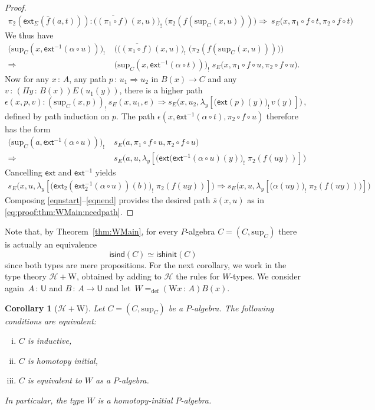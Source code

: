 \documentclass[10pt,a4paper,oneside,reqno]{amsart}
\theoremstyle{mythm}
\newtheorem{corollary}[theorem]{Corollary}
\theoremstyle{mydef}
\theoremstyle{myrmk}
\newcommand{\defeq}{=_{\mathrm{def}}}
\newcommand{\co}{\,{:}\,}
\newcommand{\com}{\circ}
\newcommand{\Hint}{\mathcal{H}}
\newcommand{\isalgind}{\mathsf{isind}}
\newcommand{\isalghinit}{\mathsf{ishinit}}
\newcommand{\ext}{\mathsf{ext}}
\newcommand{\lam}[1]{\lambda_{#1}}
\newcommand{\W}{\mathrm{W}}
\newcommand{\U}{\mathsf{U}}
\renewcommand{\sup}{\mathrm{sup}}
\begin{document}
\begin{proof}
\begin{align*}
\pi_2(\ext_\Sigma(\bar{f}(a,t))) : \big(\overline{(\pi_1 \com f)}(x,u)\big)_{!} \; \big(\pi_2(f (\sup_C(x,u))) \big)
\Rightarrow\ s_E\big(x,\pi_1 \circ f \circ t, \pi_2 \circ f \circ t\big)
\end{align*}
We thus have
\begin{align*}
\big(\sup_C(x,\ext^{-1}(\alpha \circ u))\big)_{!} \;& \big( \big(\overline{(\pi_1 \com f)}(x,u)\big)_{!} \; \big(\pi_2 (f (\sup_C(x,u))) \big) \big) \\
\Rightarrow\ &\big(\sup_C(x,\ext^{-1}(\alpha \circ t))\big)_{!} \; s_E\big(x,\pi_1 \circ f \circ u, \pi_2 \circ f \circ u\big).
\end{align*}
%
Now for any $x \co A$, any path $p \co u_1 \Rightarrow u_2$ in $B(x) \to C$ and any 
$v \co (\Pi y \co B(x))E(u_1(y))$, there is a higher path 
\[ 
\epsilon(x,p,v) : (\sup_C(x,p))_{!}\, s_E(x,u_1,e) \Rightarrow s_E\big(x,u_2, \lam{y} [\big(\ext(p)(y)\big)_{!}\, v(y)]\big)\,, 
\]
defined by path induction on $p$.
The path $\epsilon(x,\ext^{-1}(\alpha \circ t),\pi_2 \circ f \circ u)$ therefore has the form
\begin{align*}
\big(\sup_C(a,\ext^{-1}(\alpha \circ u))\big)_{!} \; &s_E\big(a,\pi_1 \circ f \circ u , \pi_2 \circ f \circ u \big)\\
\Rightarrow\ & s_E\big(a, u , \lam{y}[ \big(\ext(\ext^{-1}(\alpha \circ u)(y)\big)_{!} \; \pi_2(f(u y))]\big)
\end{align*}
Cancelling $\ext$ and $\ext^{-1}$  yields
\begin{align}
s_E\big(x,u, \lam{y}[ \big(\ext_2(\ext^{-1}_2(\alpha \circ u))(b)\big)_{!} \; \pi_2(f(u y))]\big) \Rightarrow 
s_E\big(x,u , \lam{y}[ \big(\alpha(u y )\big)_{!} \; \pi_2(f(u y )))]\big)
 \label{eqnend}
\end{align}
Composing \eqref{eqnstart}--\eqref{eqnend} provides the desired path $\bar{s}(x,u)$ as in \eqref{eq:proof:thm:WMain:needpath}.
\end{proof}



Note that, by Theorem~\ref{thm:WMain}, for every $P$-algebra $C = (C, \sup_C)$ there is actually an equivalence 
\[
\isalgind(C) \simeq \isalghinit(C)
\]
since both types are mere propositions.  For the next corollary, we work in the type theory $\Hint + \W$, obtained by adding to $\Hint$ the rules for $W$-types.
We consider again~$A \co \U$ and $B \co A \to \U$ and let~$W \defeq (\W x \co A) B(x)$.

\begin{corollary}[$\Hint + \W$]
\label{lem:WInitInt} Let $C = (C, \sup_C)$ be a $P$-algebra. The following conditions are
equivalent:
\begin{enumerate}[(i)]
\item $C$ is inductive,
\item $C$ is homotopy initial,
\item $C$ is equivalent to $W$ as a $P$-algebra.
\end{enumerate}
In particular, the type $W$ is a homotopy-initial $P$-algebra.
\end{corollary}
\end{document}
